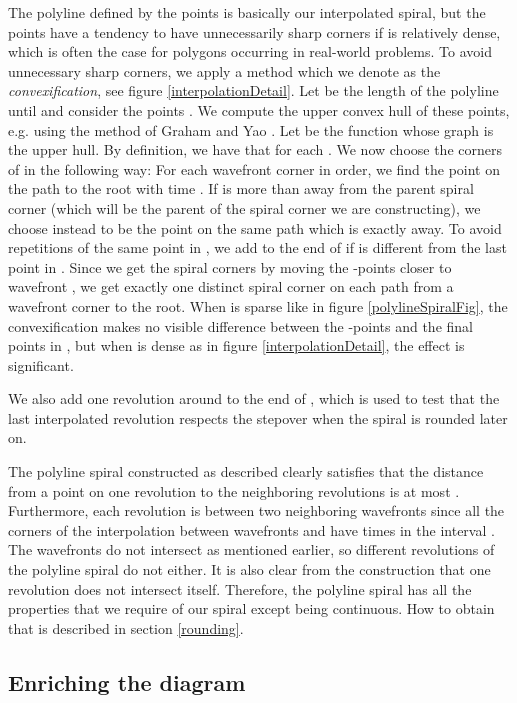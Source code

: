 \documentclass[3p]{elsarticle}
\begin{document}
The polyline defined by the points 
is basically our interpolated spiral, but the points
have a tendency to have unnecessarily sharp corners if  is relatively dense, which is
often the case for polygons  occurring in real-world problems.
To avoid unnecessary sharp corners, we apply a method which we denote as the \emph{convexification},
see figure \ref{interpolationDetail}.
Let  be the length of the polyline
until  and consider the points . We compute the upper
convex hull of these points, e.g. using the method of Graham and Yao \cite{graham1983}.
Let  be the function whose graph
is the upper hull. By definition, we have that 
for each .
We now choose the corners of  in the following way:
For each wavefront corner  in order, we find the point 
on the path to the root with time
. If  is more than  away from the parent spiral corner
 (which will be the
parent of the spiral corner we are constructing), we
choose instead  to be the point on the same path which is exactly  away.
To avoid repetitions of the same point in , we add  to the end of 
if  is different from the last point in .
Since we get the spiral corners by moving the -points closer to wavefront ,
we get exactly one distinct spiral corner on each path from a wavefront corner to the root.
When  is sparse like in figure \ref{polylineSpiralFig}, the convexification makes no visible
difference between the -points and the final points in ,
but when  is dense as in figure \ref{interpolationDetail}, the effect is significant.

We also add one revolution around  to the end of ,
which is used to test that
the last interpolated revolution respects the stepover when the spiral is rounded later on.


The polyline spiral constructed as described clearly satisfies that the distance from
a point on one revolution to the neighboring revolutions is at most .
Furthermore, each revolution is between two neighboring wavefronts
since all the corners of the interpolation between wavefronts  and  have times
in the interval .
The wavefronts do not intersect as mentioned earlier, so different revolutions of
the polyline spiral do not either. It is also clear from the construction that
one revolution does not intersect itself.
Therefore, the polyline spiral has all the properties that we require of our spiral
except being  continuous. How to obtain that is described in section
\ref{rounding}.

\subsection{Enriching the diagram}\label{enriching}
\end{document}
